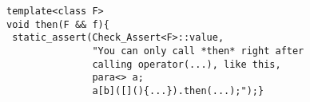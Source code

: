 
  \begin{lstlisting}[mathescape]
template<class F>
void then(F && f){
 static_assert(Check_Assert<F>::value,
               "You can only call *then* right after
               calling operator(...), like this,
               para<> a;
               a[b]([](){...}).then(...);");}
  \end{lstlisting}
